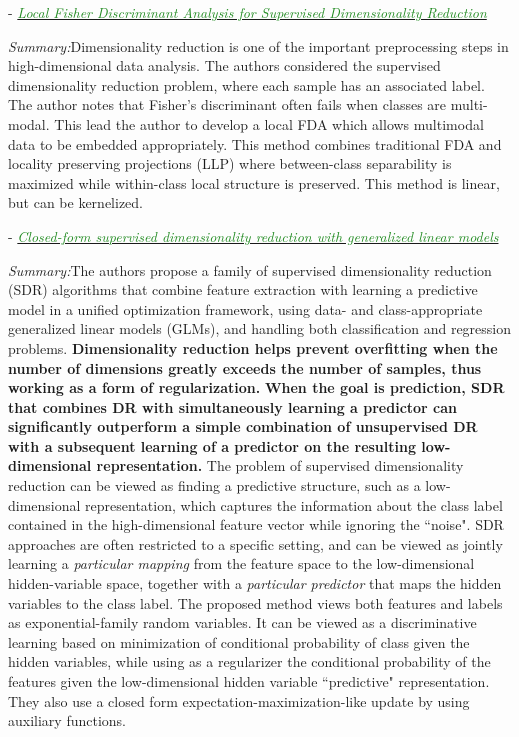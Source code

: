 \documentclass[]{article}
\newcommand{\paperentry}[4]{
            \hangindent=1cm
            \textcolor{red}{\cite{#1}} - \href{run:../References/#3}{\textcolor{ForestGreen}{\textit{#2}}}
            
            \noindent            
            \begin{minipage}[t]{0.1\linewidth}\hfill\end{minipage}
            \begin{minipage}[t]{0.8\linewidth}\textcolor{NavyBlue}{{\textit{Summary:}}}#4\end{minipage}
            \vspace{.25cm}
          }
\begin{document}
	\paperentry{Sugiyama2006FDASupDimRed}
	{Local Fisher Discriminant Analysis for Supervised Dimensionality Reduction}
	{Manifold_Representation_Learning/Supervised/Sugiyama2006FDASupDimRed.pdf}
	{Dimensionality reduction is one of the important preprocessing steps in high-dimensional data analysis. The authors considered the supervised dimensionality reduction problem, where each sample has an associated label.  The author notes that Fisher's discriminant often fails when classes are multi-modal.  This lead the author to develop a local FDA which allows multimodal data to be embedded appropriately. This method combines traditional FDA and locality preserving projections (LLP) where between-class separability is maximized while within-class local structure is preserved.  This method is linear, but can be kernelized.}
	
	\paperentry{Rish2008SupDimRedGLM}
	{Closed-form supervised dimensionality reduction with generalized linear models}
	{Manifold_Representation_Learning/Supervised/Rish2008SupDimRedGLM.pdf}
	{The authors propose a family of supervised dimensionality reduction (SDR) algorithms that combine feature extraction with learning a predictive model in a unified optimization framework, using data- and class-appropriate generalized linear models (GLMs), and handling both classification and regression problems.  \textbf{Dimensionality reduction helps prevent overfitting when the number of dimensions greatly exceeds the number of samples, thus working as a form of regularization.}  \textbf{When the goal is prediction, SDR that combines DR with simultaneously learning a predictor can significantly outperform a simple combination of unsupervised DR with a subsequent learning of a predictor on the resulting low-dimensional representation.}  The problem of supervised dimensionality reduction can be viewed as finding a predictive structure, such as a low-dimensional representation, which captures the information about the class label contained in the high-dimensional feature vector while ignoring the ``noise".  SDR approaches are often restricted to a specific setting, and can be viewed as jointly learning a \textit{particular mapping} from the feature space to the low-dimensional hidden-variable space, together with a \textit{particular predictor} that maps the hidden variables to the class label.  The proposed method views both features and labels as exponential-family random variables.  It can be viewed as a discriminative learning based on minimization of conditional probability of class given the hidden variables, while using as a regularizer the conditional probability of the features given the low-dimensional hidden variable ``predictive" representation.  They also use a closed form expectation-maximization-like update by using auxiliary functions.}
	
\end{document}
